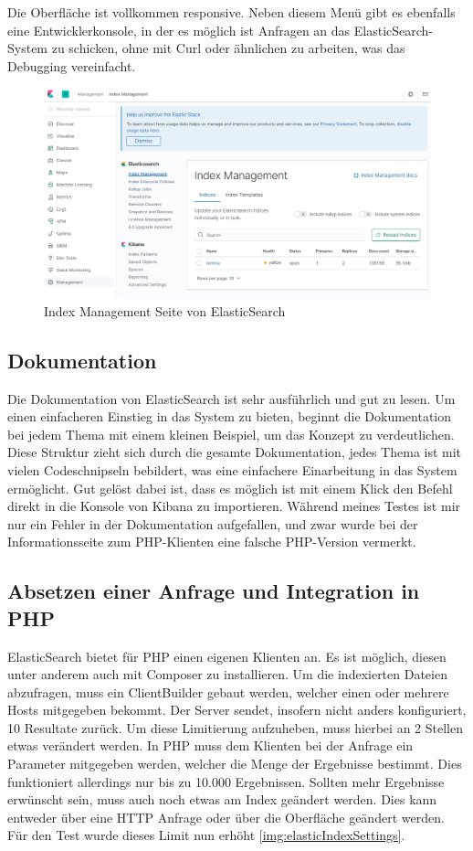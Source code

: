 Die Oberfläche ist vollkommen responsive. Neben diesem Menü gibt es ebenfalls eine Entwicklerkonsole, in der es möglich ist Anfragen an das ElasticSearch-System zu schicken, ohne mit Curl oder ähnlichen zu arbeiten, was das Debugging vereinfacht.

\begin{figure}
	\centering
	\includegraphics[width=1\linewidth]{images/elastic_ui.png}
	\caption{Index Management Seite von ElasticSearch}
	\label{img:elasticInterface}
\end{figure}


\subsection{Dokumentation}

Die Dokumentation von ElasticSearch ist sehr ausführlich und gut zu lesen. Um einen einfacheren Einstieg in das System zu bieten, beginnt die Dokumentation bei jedem Thema mit einem kleinen Beispiel, um das Konzept zu verdeutlichen. Diese Struktur zieht sich durch die gesamte Dokumentation, jedes Thema ist mit vielen Codeschnipseln bebildert, was eine einfachere Einarbeitung in das System ermöglicht. 
Gut gelöst dabei ist, dass es möglich ist mit einem Klick den Befehl direkt in die Konsole von Kibana zu importieren. Während meines Testes ist mir nur ein Fehler in der Dokumentation aufgefallen, und zwar wurde bei der Informationsseite zum PHP-Klienten eine falsche PHP-Version vermerkt.


\subsection{Absetzen einer Anfrage und Integration in PHP}

ElasticSearch bietet für PHP einen eigenen Klienten an. Es ist möglich, diesen unter anderem auch mit Composer zu installieren. Um die indexierten Dateien abzufragen, muss ein ClientBuilder gebaut werden, welcher einen oder mehrere Hosts mitgegeben bekommt. Der Server sendet, insofern nicht anders konfiguriert, 10 Resultate zurück. Um diese Limitierung aufzuheben, muss hierbei an 2 Stellen etwas verändert werden. In PHP muss dem Klienten bei der Anfrage ein Parameter mitgegeben werden, welcher die Menge der Ergebnisse bestimmt. Dies funktioniert allerdings nur bis zu 10.000 Ergebnissen. Sollten mehr Ergebnisse erwünscht sein, muss auch noch etwas am Index geändert werden. Dies kann entweder über eine HTTP Anfrage oder über die Oberfläche geändert werden. Für den Test wurde dieses Limit nun erhöht \ref{img:elasticIndexSettings}. 


